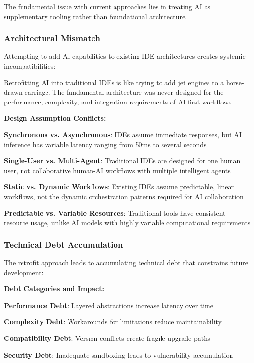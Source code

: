 The fundamental issue with current approaches lies in treating AI as supplementary tooling rather than foundational architecture.

\subsubsection{Architectural Mismatch}

Attempting to add AI capabilities to existing IDE architectures creates systemic incompatibilities:

\begin{alertbox}
Retrofitting AI into traditional IDEs is like trying to add jet engines to a horse-drawn carriage. The fundamental architecture was never designed for the performance, complexity, and integration requirements of AI-first workflows.
\end{alertbox}

\textbf{Design Assumption Conflicts:}

\begin{expandedlist}
    \item \textbf{Synchronous vs. Asynchronous}: IDEs assume immediate responses, but AI inference has variable latency ranging from 50ms to several seconds
    
    \item \textbf{Single-User vs. Multi-Agent}: Traditional IDEs are designed for one human user, not collaborative human-AI workflows with multiple intelligent agents
    
    \item \textbf{Static vs. Dynamic Workflows}: Existing IDEs assume predictable, linear workflows, not the dynamic orchestration patterns required for AI collaboration
    
    \item \textbf{Predictable vs. Variable Resources}: Traditional tools have consistent resource usage, unlike AI models with highly variable computational requirements
\end{expandedlist}

\subsubsection{Technical Debt Accumulation}

The retrofit approach leads to accumulating technical debt that constrains future development:

\textbf{Debt Categories and Impact:}

\begin{compactlist}
    \item \textbf{Performance Debt}: Layered abstractions increase latency over time
    \item \textbf{Complexity Debt}: Workarounds for limitations reduce maintainability
    \item \textbf{Compatibility Debt}: Version conflicts create fragile upgrade paths
    \item \textbf{Security Debt}: Inadequate sandboxing leads to vulnerability accumulation
\end{compactlist}

